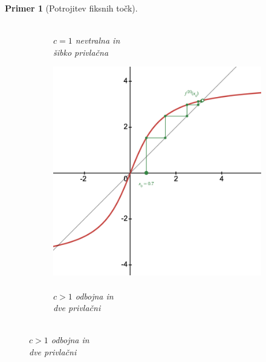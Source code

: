 \documentclass{article}
\newtheorem{primer}{Primer}
\begin{document}
\begin{primer}[Potrojitev fiksnih točk]
\begin{figure}[h]
\begin{subfigure}[c]{0.28\textwidth}
        \caption{\\$c=1$ nevtralna in\\šibko privlačna}
        \label{fig:cobweb32}
    \end{subfigure}
    \begin{subfigure}[c]{0.28\textwidth}
        \centering
        \includegraphics[width=\textwidth]{Grafi/cobweb173.png}
        \caption{\\$c>1$ odbojna in\\dve privlačni}
        \label{fig:cobweb33}
    \end{subfigure}
\end{figure}
\end{primer}
\end{document}
